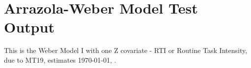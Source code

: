 \documentclass{article}
\begin{document}
\section*{Arrazola-Weber Model Test Output}

This is the Weber Model I with one Z covariate - RTI or Routine Task Intensity, due to MT19,
estimates \today, \currenttime. 

\begin{stlog}\end{stlog}
\end{document}
